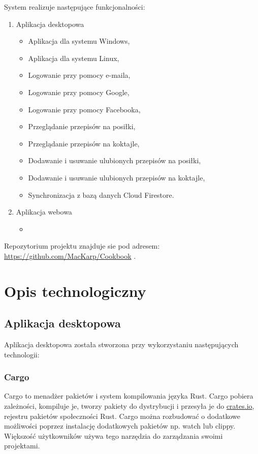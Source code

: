 \documentclass[12pt,a4paper]{article}
\begin{document}
		\indent System realizuje następujące funkcjonalności:
		\begin{enumerate}
			\item Aplikacja desktopowa
			\begin{itemize}
				\item Aplikacja dla systemu Windows,
				\item Aplikacja dla systemu Linux,
				\item Logowanie przy pomocy e-maila,
				\item Logowanie przy pomocy Google,
				\item Logowanie przy pomocy Facebooka,
				\item Przeglądanie przepisów na posiłki,
				\item Przeglądanie przepisów na koktajle,
				\item Dodawanie i usuwanie ulubionych przepisów na posiłki,
				\item Dodawanie i usuwanie ulubionych przepisów na koktajle,
				\item Synchronizacja z bazą danych Cloud Firestore.
			\end{itemize}
					\item Aplikacja webowa
			\begin{itemize}
				\item
			\end{itemize}
		\end{enumerate}
		
		\indent Repozytorium projektu znajduje sie pod adresem: \url{https://github.com/MacKarp/Cookbook} .
	\newpage
	
	\section{Opis technologiczny}
		\subsection{Aplikacja desktopowa}
			
			\indent Aplikacja desktopowa została stworzona przy wykorzystaniu następujących technologii:
				\subsubsection{Cargo}

					\indent Cargo to menadżer pakietów i system kompilowania języka Rust. Cargo pobiera zależności, kompiluje je, tworzy pakiety do dystrybucji i przesyła je do
					\url{crates.io}, rejestru pakietów społeczności Rust. Cargo można rozbudować o dodatkowe możliwości poprzez instalację dodatkowych pakietów np. watch lub clippy. Większość
					użytkowników używa tego narzędzia do zarządzania swoimi projektami. 
\end{document}
